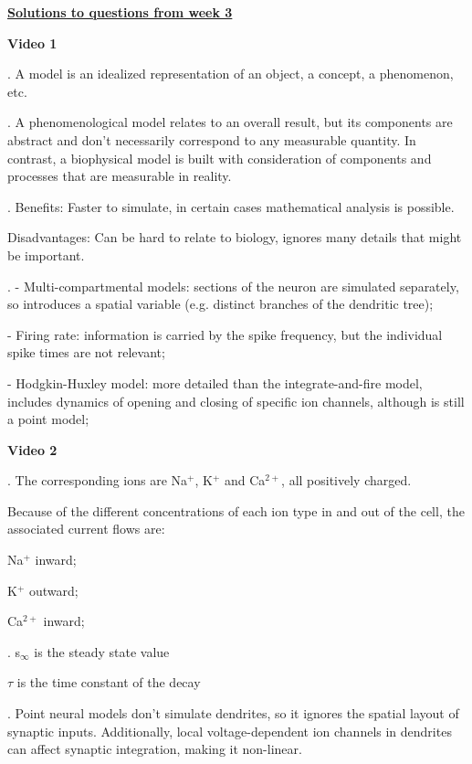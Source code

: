 \documentclass[a4paper,12pt]{article}
\begin{document}
\noindent\large\textbf{\underline{Solutions to questions from week 3}}

\vspace{0.5cm}

\noindent\normalsize\textbf{Video 1}

 

. A model is an idealized representation of an object, a concept, a phenomenon, etc.

. A phenomenological model relates to an overall result, but its components are abstract and don't necessarily correspond to any measurable quantity. In contrast, a biophysical model is built with consideration of components and processes that are measurable in reality. 

. Benefits: Faster to simulate, in certain cases mathematical analysis is possible.

Disadvantages: Can be hard to relate to biology, ignores many details that might be important.

. - Multi-compartmental models: sections of the neuron are simulated separately, so introduces a spatial variable (e.g. distinct branches of the dendritic tree);

- Firing rate: information is carried by the spike frequency, but the individual spike times are not relevant;

- Hodgkin-Huxley model: more detailed than the integrate-and-fire model, includes dynamics of opening and closing of specific ion channels, although is still a point model;


\vspace{0.5cm}

\noindent\normalsize\textbf{Video 2}


. The corresponding ions are Na$^+$, K$^+$ and Ca$^{2+}$, all positively charged. 

Because of the different concentrations of each ion type in and out of the cell, the associated current flows are:

Na$^+$ inward; 

K$^+$  outward;

Ca$^{2+}$ inward;

. s$_\infty$ is the steady state value 

$\tau$ is the time constant of the decay

. Point neural models don't simulate dendrites, so it ignores the spatial layout of synaptic inputs. Additionally, local voltage-dependent ion channels in dendrites can affect synaptic integration, making it non-linear.
\end{document}
